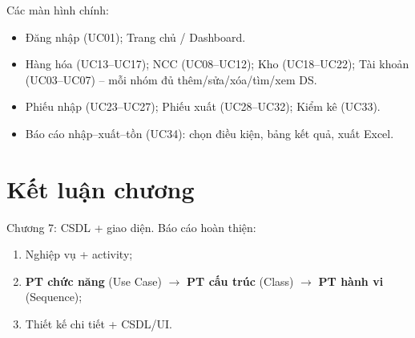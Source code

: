 Các màn hình chính:

\begin{itemize}[leftmargin=1.5cm]
    \item Đăng nhập (UC01); Trang chủ / Dashboard.
    \item Hàng hóa (UC13--UC17); NCC (UC08--UC12); Kho (UC18--UC22); Tài khoản (UC03--UC07) -- mỗi nhóm đủ thêm/sửa/xóa/tìm/xem DS.
    \item Phiếu nhập (UC23--UC27); Phiếu xuất (UC28--UC32); Kiểm kê (UC33).
    \item Báo cáo nhập--xuất--tồn (UC34): chọn điều kiện, bảng kết quả, xuất Excel.
\end{itemize}

\section{Kết luận chương}

Chương 7: CSDL + giao diện. Báo cáo hoàn thiện:
\begin{enumerate}[leftmargin=1.5cm]
    \item Nghiệp vụ + activity;
    \item \textbf{PT chức năng} (Use Case) $\rightarrow$ \textbf{PT cấu trúc} (Class) $\rightarrow$ \textbf{PT hành vi} (Sequence);
    \item Thiết kế chi tiết + CSDL/UI.
\end{enumerate}
